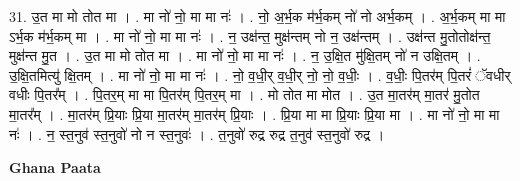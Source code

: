 \documentclass[17pt]{extarticle}
\begin{document}
31. उ॒त मा मो तोत मा । . मा नो॑ नो॒ मा मा नः॑ । . नो॒ अ॒र्भ॒क म॑र्भ॒कम् नो॑ नो अर्भ॒कम् । . अ॒र्भ॒कम् मा मा ऽर्भ॒क म॑र्भ॒कम् मा । . मा नो॑ नो॒ मा मा नः॑ । . न॒ उक्ष॑न्त॒ मुक्ष॑न्तम् नो न॒ उक्ष॑न्तम् । . उक्ष॑न्त मु॒तोतोक्ष॑न्त॒ मुक्ष॑न्त मु॒त । . उ॒त मा मो तोत मा । . मा नो॑ नो॒ मा मा नः॑ । . न॒ उ॒क्षि॒त मु॑क्षि॒तम् नो॑ न उक्षि॒तम् । . उ॒क्षि॒तमित्यु॑ क्षि॒तम् । . मा नो॑ नो॒ मा मा नः॑ । . नो॒ व॒धी॒र् व॒धी॒र् नो॒ नो॒ व॒धीः॒ । . व॒धीः॒ पि॒तर॑म् पि॒तरं॑ ॅवधीर् वधीः पि॒तर᳚म् । . पि॒तर॒म् मा मा पि॒तर॑म् पि॒तर॒म् मा । . मो तोत मा मोत । . उ॒त मा॒तर॑म् मा॒तर॑ मु॒तोत मा॒तर᳚म् । . मा॒तर॑म् प्रि॒याः प्रि॒या मा॒तर॑म् मा॒तर॑म् प्रि॒याः । . प्रि॒या मा मा प्रि॒याः प्रि॒या मा । . मा नो॑ नो॒ मा मा नः॑ । . न॒ स्त॒नुव॑ स्त॒नुवो॑ नो न स्त॒नुवः॑ । . त॒नुवो॑ रुद्र रुद्र त॒नुव॑ स्त॒नुवो॑ रुद्र । \newline

\textbf{Ghana Paata } \newline
\end{document}
